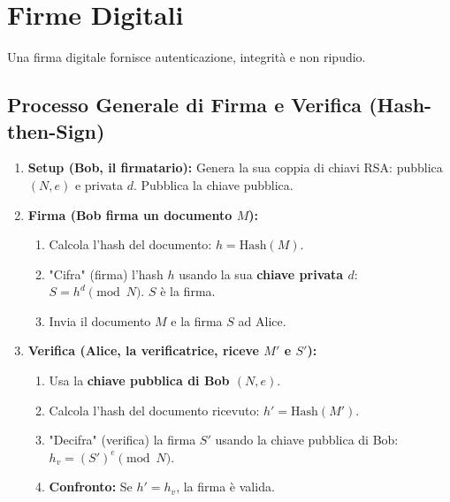 \documentclass{article}
\begin{document}
\section{Firme Digitali}
Una firma digitale fornisce autenticazione, integrità e non ripudio.

\subsection{Processo Generale di Firma e Verifica (Hash-then-Sign)}
\begin{enumerate}[label=\arabic*.]
    \item \textbf{Setup (Bob, il firmatario):}
    Genera la sua coppia di chiavi RSA: pubblica $(N, e)$ e privata $d$. Pubblica la chiave pubblica.
    \item \textbf{Firma (Bob firma un documento $M$):}
    \begin{enumerate}[label=\alph*)]
        \item Calcola l'hash del documento: $h = \text{Hash}(M)$.
        \item "Cifra" (firma) l'hash $h$ usando la sua \textbf{chiave privata $d$}: $S = h^d \pmod{N}$. $S$ è la firma.
        \item Invia il documento $M$ e la firma $S$ ad Alice.
    \end{enumerate}
    \item \textbf{Verifica (Alice, la verificatrice, riceve $M'$ e $S'$):}
    \begin{enumerate}[label=\alph*)]
        \item Usa la \textbf{chiave pubblica di Bob $(N, e)$}.
        \item Calcola l'hash del documento ricevuto: $h' = \text{Hash}(M')$.
        \item "Decifra" (verifica) la firma $S'$ usando la chiave pubblica di Bob: $h_v = (S')^e \pmod{N}$.
        \item \textbf{Confronto:} Se $h' = h_v$, la firma è valida.
    \end{enumerate}
\end{enumerate}
\end{document}
